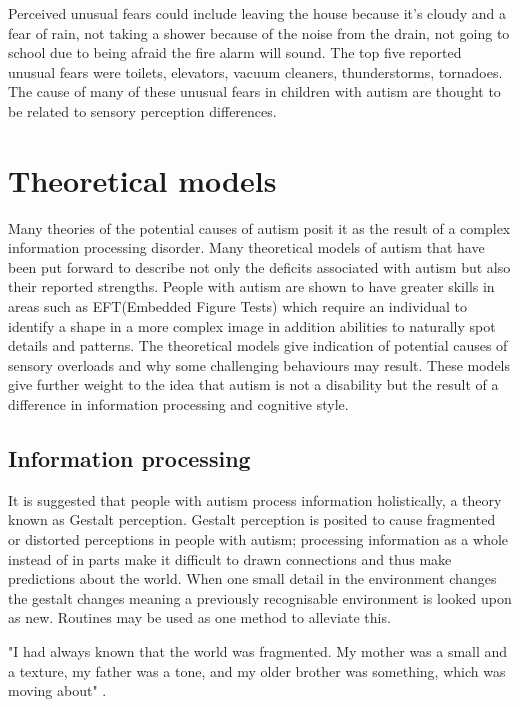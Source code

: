 \documentclass[11pt]{report}
\begin{document}
Perceived unusual fears could include leaving the house because it's cloudy and a fear of rain, not taking a shower because of the noise from the drain, not going to school due to being afraid the fire alarm will sound. The top five reported unusual fears were toilets, elevators, vacuum cleaners, thunderstorms, tornadoes. The cause of many of these unusual fears in children with autism are thought to be related to sensory perception differences\cite{fears}.

\section{Theoretical models}
Many theories of the potential causes of autism posit it as the result of a complex information processing disorder\cite{minshewmodel}. Many theoretical models of autism that have been put forward to describe not only the deficits associated with autism but also their reported strengths. People with autism are shown to have greater skills in areas such as EFT(Embedded Figure Tests) which require an individual to identify a shape in a more complex image in addition abilities to naturally spot details and patterns. The theoretical models give indication of potential causes of sensory overloads and why some challenging behaviours may result. These models give further weight to the idea that autism is not a disability but the result of a difference in information processing and cognitive style. 

\subsection{Information processing}

It is suggested that people with autism process information holistically, a theory known as Gestalt perception. Gestalt perception is posited to cause fragmented or distorted perceptions in people with autism\cite{olgab}; processing information as a whole instead of in parts make it difficult to drawn connections and thus make predictions about the world. When one small detail in the environment changes the gestalt changes meaning a previously recognisable environment is looked upon as new. Routines may be used as one method to alleviate this.

"I had always known that the world was fragmented. My mother was a small and a texture, my father was a tone, and my older brother was something, which was moving about" \cite{williams1992}. 
\end{document}

